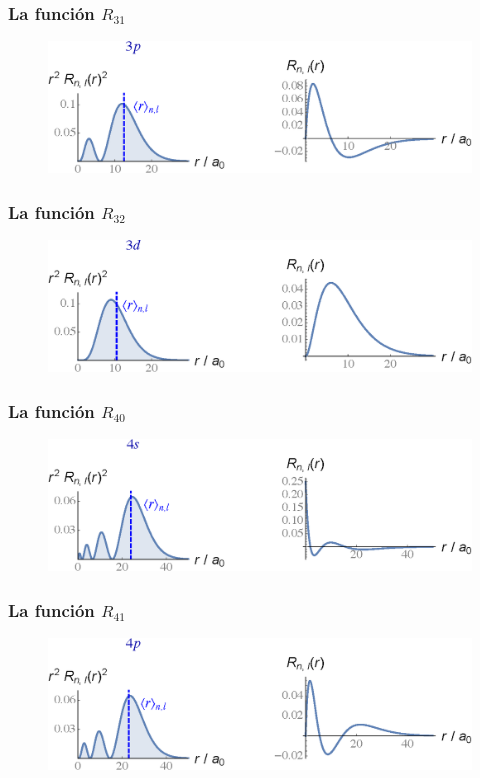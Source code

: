\begin{frame}
   \frametitle{La función $R_{31}$}
\begin{figure}
   \centering
   \includegraphics[scale=0.67]{Imagenes/Plot_Funcion_Radial_31.eps}
\end{figure}
\end{frame}
\begin{frame}
\frametitle{La función $R_{32}$}
\begin{figure}
   \centering
   \includegraphics[scale=0.67]{Imagenes/Plot_Funcion_Radial_32.eps}
\end{figure}
\end{frame}
\begin{frame}
\frametitle{La función $R_{40}$}
\begin{figure}
   \centering
   \includegraphics[scale=0.67]{Imagenes/Plot_Funcion_Radial_40.eps}
\end{figure}
\end{frame}
\begin{frame}
\frametitle{La función $R_{41}$}
\begin{figure}
   \centering
   \includegraphics[scale=0.67]{Imagenes/Plot_Funcion_Radial_41.eps}
\end{figure}
\end{frame}
